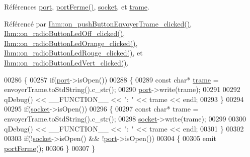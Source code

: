 Références \hyperlink{class_transmission_a0ec8a06c44492c9b4f395e7c3b1e57b9}{port}, \hyperlink{class_transmission_a4ec325c36d76fbf830253ff16e9783a7}{port\+Ferme()}, \hyperlink{class_transmission_a0b579c9da71d4b19f0504241ffbfae21}{socket}, et \hyperlink{class_transmission_af2e63afdc212381aa023a3bcb48148c1}{trame}.



Référencé par \hyperlink{class_ihm_afd32da9e614eba44bb1d3630b48e6075}{Ihm\+::on\+\_\+push\+Button\+Envoyer\+Trame\+\_\+clicked()}, \hyperlink{class_ihm_a1e328a2e8165bbef347e901f1bc5534d}{Ihm\+::on\+\_\+radio\+Button\+Led\+Off\+\_\+clicked()}, \hyperlink{class_ihm_a7e000e198b11fc38a4459f7749561ded}{Ihm\+::on\+\_\+radio\+Button\+Led\+Orange\+\_\+clicked()}, \hyperlink{class_ihm_a731ee780915cb90a5dfb11f2e02144c9}{Ihm\+::on\+\_\+radio\+Button\+Led\+Rouge\+\_\+clicked()}, et \hyperlink{class_ihm_afef5bfaa83383427e615d21d9474f466}{Ihm\+::on\+\_\+radio\+Button\+Led\+Vert\+\_\+clicked()}.


\begin{DoxyCode}
00286 \{
00287     \textcolor{keywordflow}{if}(\hyperlink{class_transmission_a0ec8a06c44492c9b4f395e7c3b1e57b9}{port}->isOpen())
00288     \{
00289         \textcolor{keyword}{const} \textcolor{keywordtype}{char}* \hyperlink{class_transmission_af2e63afdc212381aa023a3bcb48148c1}{trame} = envoyerTrame.toStdString().c\_str();
00290         \hyperlink{class_transmission_a0ec8a06c44492c9b4f395e7c3b1e57b9}{port}->write(trame);
00291 
00292         qDebug() << \_\_FUNCTION\_\_ << \textcolor{stringliteral}{": "} << trame << endl;
00293     \}
00294 
00295     \textcolor{keywordflow}{if}(\hyperlink{class_transmission_a0b579c9da71d4b19f0504241ffbfae21}{socket}->isOpen())
00296     \{
00297         \textcolor{keyword}{const} \textcolor{keywordtype}{char}* trame = envoyerTrame.toStdString().c\_str();
00298         \hyperlink{class_transmission_a0b579c9da71d4b19f0504241ffbfae21}{socket}->write(trame);
00299 
00300         qDebug() << \_\_FUNCTION\_\_ << \textcolor{stringliteral}{": "} << trame << endl;
00301     \}
00302 
00303     \textcolor{keywordflow}{if}(!\hyperlink{class_transmission_a0b579c9da71d4b19f0504241ffbfae21}{socket}->isOpen() && !\hyperlink{class_transmission_a0ec8a06c44492c9b4f395e7c3b1e57b9}{port}->isOpen())
00304     \{
00305         emit \hyperlink{class_transmission_a4ec325c36d76fbf830253ff16e9783a7}{portFerme}();
00306     \}
00307 \}
\end{DoxyCode}
